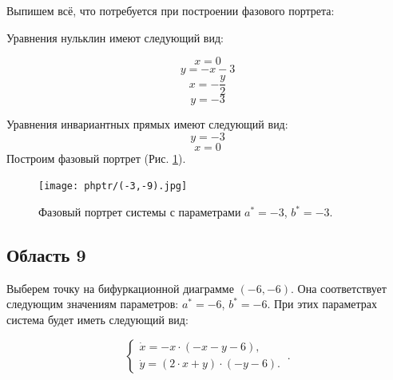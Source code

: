 Выпишем всё, что потребуется при построении фазового портрета:

Уравнения нульклин имеют следующий вид: 

$$x=0$$
$$y=- x - 3$$
$$x=- \frac{y}{2}$$
$$y=-3$$


Уравнения инвариантных прямых имеют следующий вид: 
$$y = -3$$
$$x = 0$$
Построим фазовый портрет (Рис. \ref{fig:phportr8}).

\begin{figure}[h]
	
	\texttt{[image: phptr/(-3,-9).jpg]}
	\centering
	\caption{\label{fig:phportr8} Фазовый портрет системы с параметрами $a^\ast = -3$, $b^\ast = -3$.}
	
\end{figure}

\subsection{Область 9}

Выберем точку на бифуркационной диаграмме $(-6, -6)$. Она соответствует следующим значениям параметров:  $a^\ast = -6$, $b^\ast = -6$. При этих параметрах система будет иметь следующий вид: 

$$
\left \lbrace 
\begin{matrix} 
	\dot{x} = -x \cdot (-x - y - 6), \\
	\dot{y} = (2 \cdot x + y) \cdot (-y - 6). \
\end{matrix} 
\right . .$$


